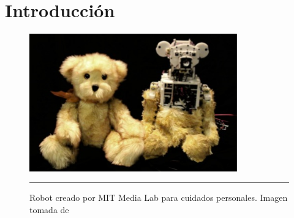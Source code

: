


\chapter{Introducción} %

\label{Chapter1} %





\begin{figure}[htbp]
	\centering
		\includegraphics[width=0.8\textwidth]{./Figures/robot.jpg}
		\rule{35em}{0.5pt}
	\caption[Robot Huggable]{Robot creado por MIT Media Lab para cuidados personales. Imagen tomada de \cite{Stiehl:2006:HTR:1179133.1179149}}
	\label{fig:Huggable}
\end{figure}


